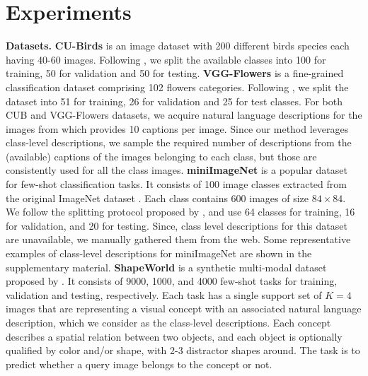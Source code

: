\documentclass{bmvc2k}
\begin{document}
\section{Experiments} \label{sec:experiments}
\noindent \textbf{Datasets.} 
\textbf{CU-Birds} \cite{WelinderEtal2010} is an image dataset with 200 different birds species each having 40-60 images. Following \cite{Su2020When}, we split the available classes into 100 for training, 50 for validation and 50 for testing.
\textbf{VGG-Flowers} is a fine-grained classification dataset comprising 102 flowers categories. Following \cite{Su2020When}, we split the dataset into 51 for training, 26 for validation and 25 for test classes. For both CUB and VGG-Flowers datasets, we acquire natural language descriptions for the images from \cite{reed2016learning} which provides 10 captions per image. Since our method leverages class-level descriptions, we sample the required number of descriptions from the (available) captions of the images belonging to each class, but those are consistently used for all the class images.
\textbf{miniImageNet} \cite{NIPS2016_90e13578} is a popular dataset for few-shot classification tasks. It consists of 100 image classes extracted from the original ImageNet dataset \cite{imagenet_cvpr09}. Each class contains 600 images of size $84\times84$. We follow the splitting protocol proposed by \cite{NIPS2016_90e13578}, and use 64 classes for training, 16 for validation, and 20 for testing. Since, class level descriptions for this dataset are unavailable, we manually gathered them from the web. Some representative examples of class-level descriptions for miniImageNet  are shown in the supplementary material. 
\textbf{ShapeWorld} is a synthetic multi-modal dataset proposed by \cite{Kuhnle2017ShapeWorldA}. It consists of 9000, 1000, and 4000 few-shot tasks for training, validation and testing, respectively. Each task has a single support set of $K = 4$ images that are representing a visual concept with an associated natural language description, which we consider as the class-level descriptions. Each concept describes a spatial relation between two objects, and each object is optionally qualified by color and/or shape, with 2-3 distractor shapes around. The task is to predict whether a query image belongs to the concept or not.
                 
\end{document}
